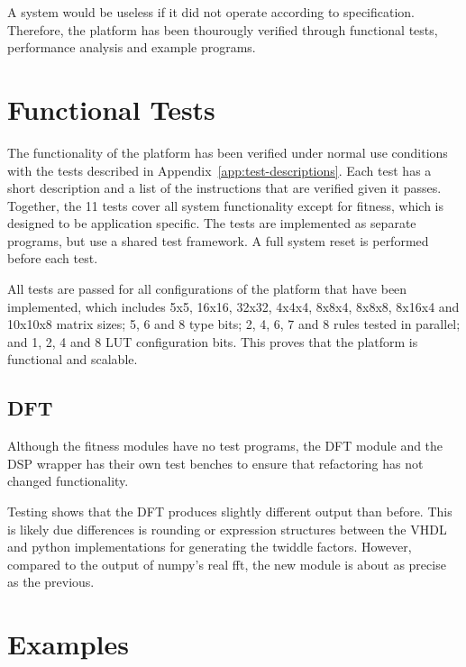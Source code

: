 A system would be useless if it did not operate according to specification.
Therefore, the platform has been thourougly verified through functional tests, performance analysis and example programs.


\section{Functional Tests}

The functionality of the platform has been verified under normal use conditions with the tests described in Appendix~\ref{app:test-descriptions}.
Each test has a short description and a list of the instructions that are verified given it passes.
Together, the 11 tests cover all system functionality except for fitness, which is designed to be application specific.
The tests are implemented as separate programs, but use a shared test framework.
A full system reset is performed before each test.

All tests are passed for all configurations of the platform that have been implemented, which includes 5x5, 16x16, 32x32, 4x4x4, 8x8x4, 8x8x8, 8x16x4 and 10x10x8 matrix sizes; 5, 6 and 8 type bits; 2, 4, 6, 7 and 8 rules tested in parallel; and 1, 2, 4 and 8 LUT configuration bits.
This proves that the platform is functional and scalable.

\subsection{DFT}

Although the fitness modules have no test programs, the DFT module and the DSP wrapper has their own test benches to ensure that refactoring has not changed functionality.

Testing shows that the DFT produces slightly different output than before.
This is likely due differences is rounding or expression structures between the VHDL and python implementations for generating the twiddle factors.
However, compared to the output of numpy's real fft, the new module is about as precise as the previous.



\section{Examples}

